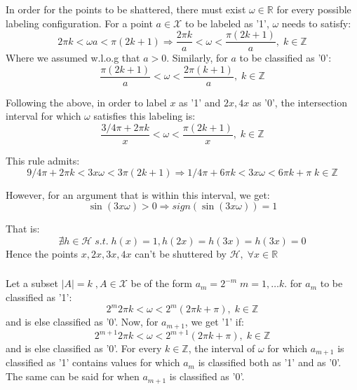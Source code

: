\subsubsection{}
In order for the points to be shattered, there must exist $\omega \in \mathbb{R}$ for every possible labeling configuration.
For a point $a \in \mathcal{X}$ to be labeled as '1', $\omega$ needs to satisfy:
\begin{equation*}
    2 \pi k < \omega a < \pi (2k + 1) \Rightarrow \frac{2 \pi k}{a} < \omega < \frac{\pi (2k + 1)}{a},  \; k\in \mathbb{Z}
\end{equation*}
Where we assumed w.l.o.g that $a>0$. Similarly, for $a$ to be classified as '0':
\begin{equation*}
    \frac{\pi(2k+1)}{a} < \omega < \frac{2\pi(k + 1)}{a},  \; k\in \mathbb{Z}
\end{equation*}

Following the above, in order to label $x$ as '1' and $2x, 4x$ as '0', the intersection interval for which $\omega$ satisfies this labeling is:
\begin{equation*}
    \frac{3/4 \pi + 2 \pi k}{x} < \omega < \frac{\pi (2k + 1)}{x},  \; k\in \mathbb{Z}
\end{equation*}

This rule admits:
\begin{equation*}
    9/4 \pi + 2 \pi k < 3x \omega  < 3\pi (2k + 1) \Rightarrow
    1/4 \pi + 6 \pi k < 3x \omega  < 6\pi k + \pi \; k\in \mathbb{Z}
\end{equation*}

However, for an argument that is within this interval, we get:
\begin{equation*}
    \sin(3x\omega) > 0 \Rightarrow sign(\sin(3x\omega)) = 1
\end{equation*}

That is:
\begin{equation*}
    \nexists h\in \mathcal{H} \; s.t. \; h(x)=1, h(2x)=h(3x)=h(3x)=0
\end{equation*}
Hence the points $x, 2x, 3x, 4x$ can't be shuttered by $\mathcal{H}, \; \forall x\in \mathbb{R}$

\subsubsection{}
Let a subset $|A|=k \;, A\in \mathcal{X}$ be of the form $a_m = 2^{-m} \; m=1,\dotsc k$.
for $a_m$ to be classified as '1':
\begin{equation*}
   2^m 2\pi k < \omega < 2^m (2\pi k + \pi),  \; k\in \mathbb{Z}
\end{equation*}
and is else classified as '0'. Now, for $a_{m+1}$, we get '1' if:
\begin{equation*}
    2^{m+1} 2\pi k < \omega < 2^{m+1} (2\pi k + \pi),  \; k\in \mathbb{Z}
 \end{equation*}
and is else classified as '0'. For every $k\in \mathbb{Z}$, the interval of $\omega$ for which $a_{m+1}$ is classified as '1' contains values for which $a_m$ is classified both as '1' and as '0'. The same can be said for when $a_{m+1}$ is classified as '0'.

